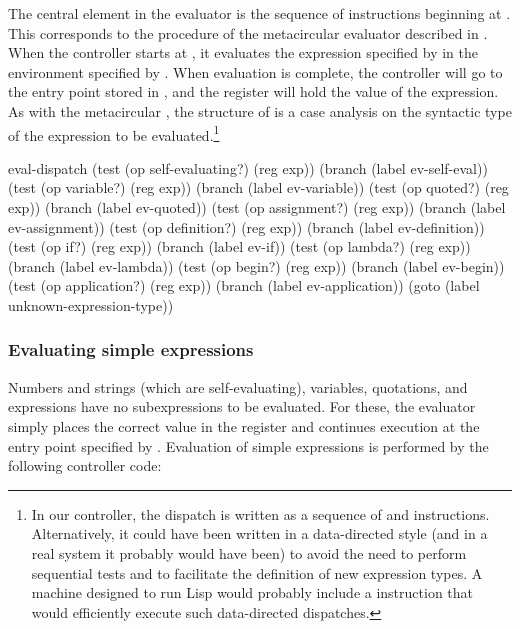 The central element in the evaluator is the sequence of instructions beginning
at .  This corresponds to the  procedure of the
metacircular evaluator described in .  When the controller
starts at , it evaluates the expression specified by
 in the environment specified by .  When evaluation is
complete, the controller will go to the entry point stored in ,
and the  register will hold the value of the expression.  As with the
metacircular , the structure of  is a case
analysis on the syntactic type of the expression to be evaluated.\footnote{In
our controller, the dispatch is written as a sequence of  and
 instructions.  Alternatively, it could have been written in a
data-directed style (and in a real system it probably would have been) to avoid
the need to perform sequential tests and to facilitate the definition of new
expression types.  A machine designed to run Lisp would probably include a
 instruction that would efficiently execute such
data-directed dispatches.}

\begin{codeBlock}
eval-dispatch
  (test (op self-evaluating?) (reg exp))
  (branch (label ev-self-eval))
  (test (op variable?) (reg exp))
  (branch (label ev-variable))
  (test (op quoted?) (reg exp))
  (branch (label ev-quoted))
  (test (op assignment?) (reg exp))
  (branch (label ev-assignment))
  (test (op definition?) (reg exp))
  (branch (label ev-definition))
  (test (op if?) (reg exp))
  (branch (label ev-if))
  (test (op lambda?) (reg exp))
  (branch (label ev-lambda))
  (test (op begin?) (reg exp))
  (branch (label ev-begin))
  (test (op application?) (reg exp))
  (branch (label ev-application))
  (goto (label unknown-expression-type))
\end{codeBlock}

\subsubsection*{Evaluating simple expressions}

Numbers and strings (which are self-evaluating), variables, quotations, and
 expressions have no subexpressions to be evaluated.  For these,
the evaluator simply places the correct value in the  register and
continues execution at the entry point specified by .
Evaluation of simple expressions is performed by the following controller code:

